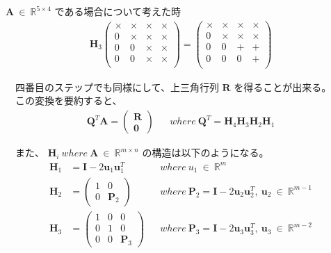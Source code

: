 \documentclass[dvipdfmx,10pt,presentation]{beamer}
\begin{document}
\begin{frame}[allowframebreaks]{\(\bm{A}\ \in\ \mathbb{R}^{5\times4}\) である場合について考えた時}
\begin{align*}
\bm{H}_3
\begin{pmatrix}
\times & \times & \times & \times \\
0 & \times & \times & \times \\
0 & 0 & \times & \times \\
0 & 0 & \times & \times \\
\end{pmatrix}
=
\begin{pmatrix}
\times & \times & \times & \times \\
0 & \times & \times & \times \\
0 & 0 & + & + \\
0 & 0 & 0 & + \\
\end{pmatrix}
\end{align*}

　四番目のステップでも同様にして、上三角行列 \(\bm{R}\) を得ることが出来る。\\
　この変換を要約すると、\\

\begin{align*}
\bm{Q}^T\bm{A}=
\begin{pmatrix}
\bm{R} \\
\bm{0}
\end{pmatrix}
&& where\ \bm{Q}^T =\bm{H}_4\bm{H}_3\bm{H}_2\bm{H}_1
\end{align*}

　また、 \(\bm{H}_i\ where\ \bm{A}\ \in\ \mathbb{R}^{m\times n}\) の構造は以下のようになる。\\

\begin{align}
\bm{H}_1 &= \bm{I} - 2\bm{u}_1\bm{u}_1^T && where\ u_1\ \in\ \mathbb{R}^m \nonumber \\
\bm{H}_2 &= 
\begin{pmatrix}
1 & 0 \\
0 & \bm{P}_2
\end{pmatrix}
&& where\ \bm{P}_2=\bm{I} - 2\bm{u}_2\bm{u}_2^T,\ \bm{u}_2\ \in\ \mathbb{R}^{m-1}
\nonumber \\ 
\bm{H}_3 &= 
\begin{pmatrix}
1 & 0 & 0 \\
0 & 1 & 0 \\
0 & 0 & \bm{P}_3 
\end{pmatrix}
&& where\ \bm{P}_3=\bm{I} - 2\bm{u}_3\bm{u}_3^T,\ \bm{u}_3\ \in\ \mathbb{R}^{m-2}
\tag{5.1}
\end{align}




\end{frame}
\end{document}
